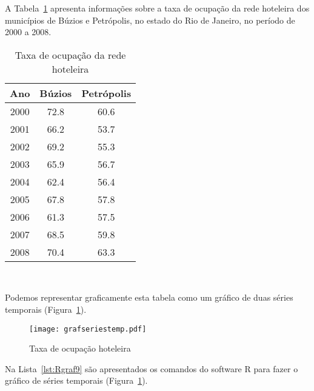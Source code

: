 \documentclass[11pt,fleqn]{book} %
\begin{document}
\begin{example}

A Tabela~\ref{tab:taxaocup} apresenta informações sobre a taxa de ocupação da rede hoteleira dos municípios de Búzios e Petrópolis, no estado do Rio de Janeiro, no período de 2000 a 2008. \\	

\begin{table}[h]
	\caption{Taxa de ocupação da rede hoteleira}
	\label{tab:taxaocup} 
	\centering
	\begin{tabular}{c c c}
	\toprule
	\textbf{Ano} & \textbf{Búzios} & \textbf{Petrópolis}\\
	\midrule
	2000 & 72.8 & 60.6 \\
	2001 & 66.2 & 53.7 \\
	2002 & 69.2 & 55.3 \\
	2003 & 65.9 & 56.7 \\
	2004 & 62.4 & 56.4 \\
	2005 & 67.8 & 57.8 \\
	2006 & 61.3 & 57.5 \\
	2007 & 68.5 & 59.8 \\
	2008 & 70.4 & 63.3 \\
	\bottomrule
	\end{tabular} \\
\end{table}

Podemos representar graficamente esta tabela como um gráfico de duas séries temporais (Figura~\ref{fig:grafseriestemp}).

\begin{figure}[h!]
\centering\texttt{[image: grafseriestemp.pdf]}
\setlength{\abovecaptionskip}{0.5pt}
\caption{Taxa de ocupação hoteleira}
\label{fig:grafseriestemp} %
\end{figure}

\end{example}

\vspace{0,3cm}

Na Lista~\ref{lst:Rgraf9} são apresentados os comandos do software R para fazer o gráfico de séries temporais (Figura~\ref{fig:grafseriestemp}). \\
\end{document}
